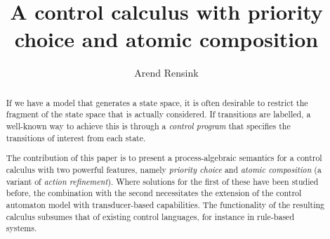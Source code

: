 \title{A control calculus with priority choice and atomic composition}

\author{Arend Rensink}

\begin{abstract}
If we have a model that generates a state space, it is often desirable to restrict the fragment of the state space that is actually considered. If transitions are labelled, a well-known way to achieve this is through a \emph{control program} that specifies the transitions of interest from each state.

The contribution of this paper is to present a process-algebraic semantics for a control calculus with two powerful features, namely \emph{priority choice} and \emph{atomic composition} (a variant of \emph{action refinement}). Where solutions for the first of these have been studied before, the combination with the second necessitates the extension of the control automaton model with transducer-based capabilities. The functionality of the resulting calculus subsumes that of existing control languages, for instance in rule-based systems.
\end{abstract}
